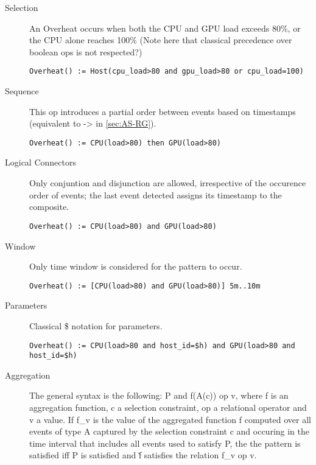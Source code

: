 \begin{description}
	\item[Selection] An \textsf{Overheat} occurs when both the CPU and GPU load exceeds 80\%, or the CPU alone reaches 100\% (Note here that classical precedence over boolean ops is not respected?)
	
	\begin{lstlisting}[language=iotdsl]
Overheat() := Host(cpu_load>80 and gpu_load>80 or cpu_load=100)
\end{lstlisting}

	\item[Sequence] This op introduces a partial order between events based on timestamps (equivalent to \textsf{->} in \ref{sec:AS-RG}).
	
	\begin{lstlisting}[language=iotdsl]
Overheat() := CPU(load>80) then GPU(load>80)
\end{lstlisting}
	
	\item[Logical Connectors] Only conjuntion and disjunction are allowed, irrespective of the occurence order of events; the last event detected assigns its timestamp to the composite.
	
	\begin{lstlisting}[language=iotdsl]
Overheat() := CPU(load>80) and GPU(load>80)
\end{lstlisting}
	
	\item[Window] Only time window is considered for the pattern to occur.
	
	\begin{lstlisting}[language=iotdsl]
Overheat() := [CPU(load>80) and GPU(load>80)] 5m..10m
\end{lstlisting}
	
	\item[Parameters] Classical \textsf{\$} notation for parameters.
	
	\begin{lstlisting}[language=iotdsl]
Overheat() := CPU(load>80 and host_id=$h) and GPU(load>80 and host_id=$h)
\end{lstlisting}
	
	\item[Aggregation] The general syntax is the following: \textsf{P and f(A(c)) op v}, where \textsf{f} is an aggregation function, \textsf{c} a selection constraint, \textsf{op} a relational operator and \textsf{v} a value. If \textsf{f\_v} is the value of the aggregated function \textsf{f} computed over all events of type \textsf{A} captured by the selection constraint \textsf{c} and occuring in the time interval that includes all events used to satisfy \textsf{P}, the the pattern is satisfied iff \textsf{P} is satisfied and \textsf{f\v} satisfies the relation \textsf{f\_v op v}. 
	

\end{description}
